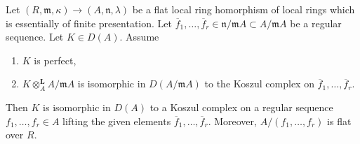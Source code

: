 \begin{lemma}
\label{lemma-deform-koszul}
Let $(R, \mathfrak m, \kappa) \to (A, \mathfrak n, \lambda)$
be a flat local ring homorphism of local rings
which is essentially of finite presentation.
Let $\overline{f}_1, \ldots, \overline{f}_r \in \mathfrak n/\mathfrak m A
\subset A/\mathfrak m A$ be a regular sequence. Let $K \in D(A)$. Assume
\begin{enumerate}
\item $K$ is perfect,
\item $K \otimes_A^\mathbf{L} A/\mathfrak m A$ is isomorphic in
$D(A/\mathfrak m A)$ to the
Koszul complex on $\overline{f}_1, \ldots, \overline{f}_r$.
\end{enumerate}
Then $K$ is isomorphic in $D(A)$ to a Koszul complex on a regular sequence
$f_1, \ldots, f_r \in A$ lifting the given elements
$\overline{f}_1, \ldots, \overline{f}_r$. Moreover, $A/(f_1, \ldots, f_r)$
is flat over $R$.
\end{lemma}

